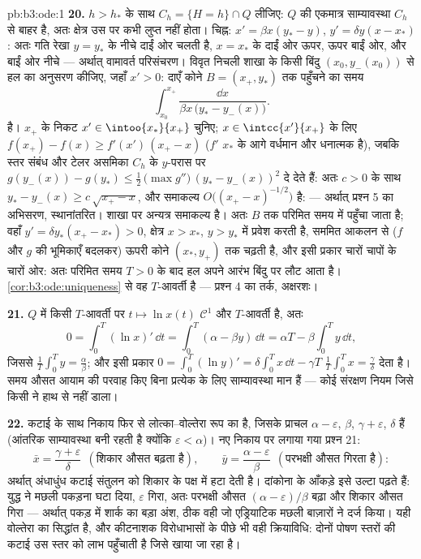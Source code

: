 \begin{solution}{pb:b3:ode:1}
\textbf{20.} $h > h_*$ के साथ $C_h = \{H = h\}\cap Q$ लीजिए: $Q$ की एकमात्र साम्यावस्था
$C_h$ से बाहर है, अतः क्षेत्र उस पर कभी लुप्त नहीं होता। चिह्न:
$x' = \beta x(y_* - y)$, $y' =
\delta y(x - x_*)$: अतः गति रेखा $y
= y_*$ के नीचे दाईं ओर चलती है, $x = x_*$ के
दाईं ओर ऊपर, ऊपर बाईं ओर, और बाईं ओर नीचे --- अर्थात् वामावर्त
परिसंचरण। विवृत निचली शाखा के किसी बिंदु $(x_0, y_-(x_0))$ से हल का अनुसरण कीजिए,
जहाँ $x' > 0$: दाएँ कोने $B = (x_+, y_*)$ तक पहुँचने का समय
\[
\int_{x_0}^{x_+}\frac{\dd x}{\beta x\,\bigl(y_* -
y_-(x)\bigr)} .
\]
है। $x_+$ के निकट $x' \in \intoo{x_*}{x_+}$ चुनिए; $x \in
\intcc{x'}{x_+}$ के लिए $f(x_+) - f(x) \geq f'(x')\,(x_+ - x)$ ($f'$ $x_*$ के
आगे वर्धमान और धनात्मक है), जबकि स्तर संबंध और टेलर असमिका $C_h$ के
 $y$-परास पर $g(y_-(x)) -
g(y_*) \leq \frac12\,\bigl(\max g''\bigr)\,(y_* -
y_-(x))^2$ दे देते हैं: अतः $c > 0$ के साथ $y_* -
y_-(x) \geq c\,\sqrt{x_+ - x}$, और
समाकल्य $O\bigl((x_+ - x)^{-1/2}\bigr)$ है:  --- अर्थात् प्रश्न 5 का अभिसरण, स्थानांतरित।
शाखा पर अन्यत्र समाकल्य  है। अतः $B$ तक परिमित समय में पहुँचा
जाता है; वहाँ $y' = \delta y_*(x_+ - x_*) > 0$,  क्षेत्र $x > x_*$, $y > y_*$ में प्रवेश करती है,
सममित आकलन से ($f$ और $g$ की भूमिकाएँ बदलकर) ऊपरी कोने $(x_*, y_+)$ तक
चढ़ती है, और इसी प्रकार चारों चापों के चारों ओर: अतः परिमित समय $T > 0$
के बाद हल अपने आरंभ बिंदु पर लौट आता है। \cref{cor:b3:ode:uniqueness} से वह $T$-आवर्ती
है --- प्रश्न 4 का तर्क, अक्षरशः।

\textbf{21.} $Q$ में किसी $T$-आवर्ती  पर $t \mapsto \ln
x(t)$ $\mathcal C^1$ और
$T$-आवर्ती है, अतः
\[
0 = \int_0^T(\ln x)'\,\dd t
= \int_0^T(\alpha - \beta y)\,\dd t
= \alpha T - \beta\int_0^Ty\,\dd t ,
\]
जिससे $\frac1T\int_0^Ty = \frac\alpha\beta$; और इसी प्रकार $0 =
\int_0^T(\ln y)' = \delta\int_0^Tx\,\dd t - \gamma T$ $\frac1T\int_0^Tx = \frac\gamma\delta$ देता है। समय औसत आयाम की परवाह
किए बिना प्रत्येक  के लिए साम्यावस्था मान हैं --- कोई संरक्षण
नियम जिसे किसी ने हाथ से नहीं डाला।

\textbf{22.} कटाई के साथ निकाय फिर से लोत्का--वोल्तेरा रूप का है,
जिसके प्राचल $\alpha -
\varepsilon$, $\beta$, $\gamma + \varepsilon$, $\delta$ हैं (आंतरिक साम्यावस्था बनी
रहती है क्योंकि $\varepsilon <
\alpha$)। नए निकाय पर लगाया गया प्रश्न 21:
\[
\bar x = \frac{\gamma + \varepsilon}{\delta}
\ \ (\text{शिकार औसत बढ़ता है}),
\qquad
\bar y = \frac{\alpha - \varepsilon}{\beta}
\ \ (\text{परभक्षी औसत गिरता है}) :
\]
अर्थात् अंधाधुंध कटाई संतुलन को शिकार के पक्ष में हटा देती है।
दांकोना के आँकड़े इसे उल्टा पढ़ते हैं: युद्ध ने मछली पकड़ना घटा दिया,
$\varepsilon$ गिरा, अतः परभक्षी औसत $(\alpha - \varepsilon)/\beta$ बढ़ा और शिकार औसत गिरा --- अर्थात्
पकड़ में शार्क का बड़ा अंश, ठीक वही जो एड्रियाटिक मछली बाज़ारों ने
दर्ज किया। यही वोल्तेरा का सिद्धांत है, और कीटनाशक विरोधाभासों के
पीछे भी वही क्रियाविधि: दोनों पोषण स्तरों की कटाई उस स्तर को लाभ
पहुँचाती है जिसे खाया जा रहा है।


\end{solution}
